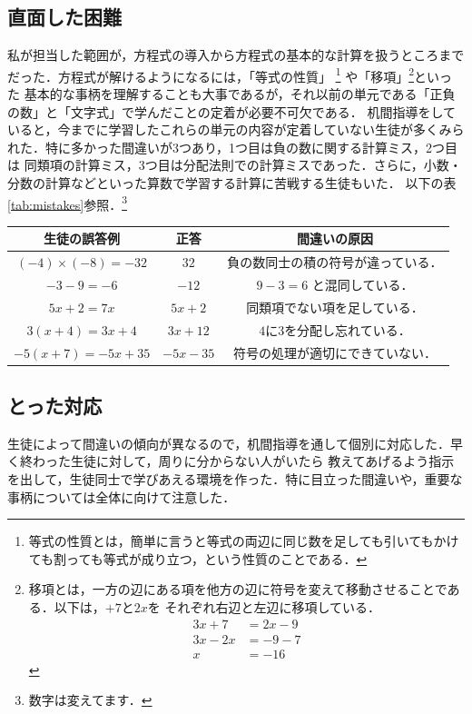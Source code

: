 \documentclass{jlreq}
\begin{document}
\subsection{直面した困難}
私が担当した範囲が，方程式の導入から方程式の基本的な計算を扱うところまでだった．方程式が解けるようになるには，「等式の性質」
\footnote{等式の性質とは，簡単に言うと等式の両辺に同じ数を足しても引いてもかけても割っても等式が成り立つ，という性質のことである．}
や「移項」\footnote{移項とは，一方の辺にある項を他方の辺に符号を変えて移動させることである．以下は，$+7$と$2x$を
それぞれ右辺と左辺に移項している．
\begin{align*}
    3x+7&=2x-9 \\
    3x-2x&=-9-7 \\
    x&=-16
\end{align*}}といった
基本的な事柄を理解することも大事であるが，それ以前の単元である「正負の数」と「文字式」で学んだことの定着が必要不可欠である．
机間指導をしていると，今までに学習したこれらの単元の内容が定着していない生徒が多くみられた．特に多かった間違いが3つあり，1つ目は負の数に関する計算ミス，2つ目は
同類項の計算ミス，3つ目は分配法則での計算ミスであった．さらに，小数・分数の計算などといった算数で学習する計算に苦戦する生徒もいた．
以下の表\ref{tab:mistakes}参照．\footnote{数字は変えてます．}
\vspace{3mm}
\begin{center}
    \captionsetup{font=bf}
    \label{tab:mistakes}
    \renewcommand{\arraystretch}{1.3}
\begin{tabular}{|c|c|c|}
    \hline
    \textbf{生徒の誤答例} & \textbf{正答} & \textbf{間違いの原因}\\
    \hline
    $(-4)\times(-8) = -32$ & $32$ & 負の数同士の積の符号が違っている．\\
    $-3-9 = -6$ & $-12$ & $9-3=6$ と混同している．\\
    $5x+2 = 7x$ & $5x+2$ & 同類項でない項を足している． \\
    $3(x+4) = 3x+4$ & $3x+12$ & $4$に$3$を分配し忘れている． \\
    $-5(x+7) = -5x+35$ & $-5x-35$ & 符号の処理が適切にできていない．\\
    \hline
\end{tabular}
\end{center}
\vspace{5mm}

\subsection{とった対応}
生徒によって間違いの傾向が異なるので，机間指導を通して個別に対応した．早く終わった生徒に対して，周りに分からない人がいたら
教えてあげるよう指示を出して，生徒同士で学びあえる環境を作った．特に目立った間違いや，重要な事柄については全体に向けて注意した．
\end{document}
